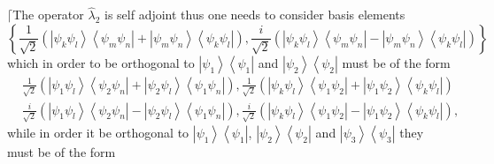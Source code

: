 \documentclass[aps,preprint]{revtex4}%
\begin{document}
$\lceil$The operator $\hat{\lambda}_{2}$ is self adjoint thus one needs to
consider basis elements
\begin{equation}
\left\{  \frac{1}{\sqrt{2}}\left(  \left\vert \psi_{k}\psi_{l}\right\rangle
\left\langle \psi_{m}\psi_{n}\right\vert +\left\vert \psi_{m}\psi
_{n}\right\rangle \left\langle \psi_{k}\psi_{l}\right\vert \right)  ,\frac
{i}{\sqrt{2}}\left(  \left\vert \psi_{k}\psi_{l}\right\rangle \left\langle
\psi_{m}\psi_{n}\right\vert -\left\vert \psi_{m}\psi_{n}\right\rangle
\left\langle \psi_{k}\psi_{l}\right\vert \right)  \right\}
\end{equation}
which in order to be orthogonal to $\left\vert \psi_{1}\right\rangle
\left\langle \psi_{1}\right\vert $ and $\left\vert \psi_{2}\right\rangle
\left\langle \psi_{2}\right\vert $ must be of the form
\begin{align}
&  \frac{1}{\sqrt{2}}\left(  \left\vert \psi_{1}\psi_{l}\right\rangle
\left\langle \psi_{2}\psi_{n}\right\vert +\left\vert \psi_{2}\psi
_{l}\right\rangle \left\langle \psi_{1}\psi_{n}\right\vert \right)  ,\frac
{1}{\sqrt{2}}\left(  \left\vert \psi_{k}\psi_{l}\right\rangle \left\langle
\psi_{1}\psi_{2}\right\vert +\left\vert \psi_{1}\psi_{2}\right\rangle
\left\langle \psi_{k}\psi_{l}\right\vert \right) \nonumber\\
&  \frac{i}{\sqrt{2}}\left(  \left\vert \psi_{1}\psi_{l}\right\rangle
\left\langle \psi_{2}\psi_{n}\right\vert -\left\vert \psi_{2}\psi
_{l}\right\rangle \left\langle \psi_{1}\psi_{n}\right\vert \right)  ,\frac
{i}{\sqrt{2}}\left(  \left\vert \psi_{k}\psi_{l}\right\rangle \left\langle
\psi_{1}\psi_{2}\right\vert -\left\vert \psi_{1}\psi_{2}\right\rangle
\left\langle \psi_{k}\psi_{l}\right\vert \right)  ,
\end{align}
while in order it be orthogonal to $\left\vert \psi_{1}\right\rangle
\left\langle \psi_{1}\right\vert $, $\left\vert \psi_{2}\right\rangle
\left\langle \psi_{2}\right\vert $ and $\left\vert \psi_{3}\right\rangle
\left\langle \psi_{3}\right\vert $ they must be of the form
\end{document}
